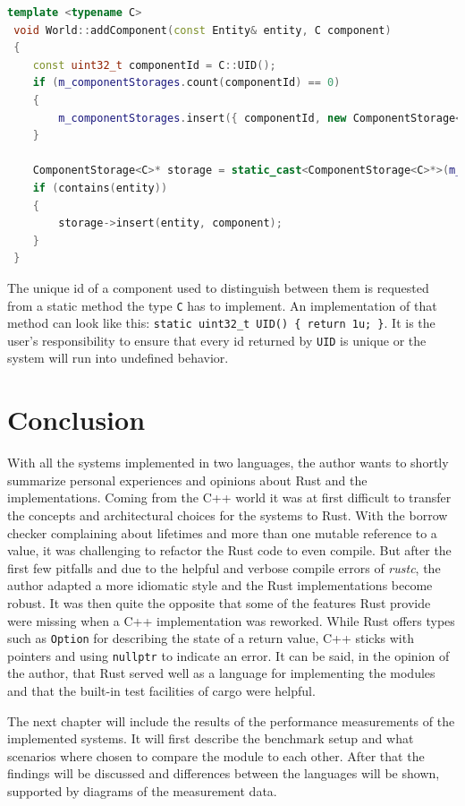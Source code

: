  \begin{lstlisting}[caption={Method to add components, implicitly registering them on first use}, label={lst:cpp_register_comp}, language={C++}]
 template <typename C>
 void World::addComponent(const Entity& entity, C component)
 {
 	const uint32_t componentId = C::UID();
 	if (m_componentStorages.count(componentId) == 0)
 	{
 		m_componentStorages.insert({ componentId, new ComponentStorage<C>() });
 	}
 	
 	ComponentStorage<C>* storage = static_cast<ComponentStorage<C>*>(m_componentStorages.at(componentId));
 	if (contains(entity))
 	{
 		storage->insert(entity, component);
 	}
 }
\end{lstlisting}
 
\noindent
The unique id of a component used to distinguish between them is requested from a static method the type \texttt{C} has to implement. An implementation of that method can look like this: \texttt{static uint32\_t UID() \{ return 1u; \}}. It is the user's responsibility to ensure that every id returned by \texttt{UID} is unique or the system will run into undefined behavior.

\section{Conclusion}

With all the systems implemented in two languages, the author wants to shortly summarize personal experiences and opinions about Rust and the implementations. Coming from the C++ world it was at first difficult to transfer the concepts and architectural choices for the systems to Rust. With the borrow checker complaining about lifetimes and more than one mutable reference to a value, it was challenging to refactor the Rust code to even compile. But after the first few pitfalls and due to the helpful and verbose compile errors of \textit{rustc}, the author adapted a more idiomatic style and the Rust implementations become robust. It was then quite the opposite that some of the features Rust provide were missing when a C++ implementation was reworked. While Rust offers types such as \texttt{Option} for describing the state of a return value, C++ sticks with pointers and using \texttt{nullptr} to indicate an error. It can be said, in the opinion of the author, that Rust served well as a language for implementing the modules and that the built-in test facilities of cargo were helpful.

The next chapter will include the results of the performance measurements of the implemented systems. It will first describe the benchmark setup and what scenarios where chosen to compare the module to each other. After that the findings will be discussed and differences between the languages will be shown, supported by diagrams of the measurement data.


